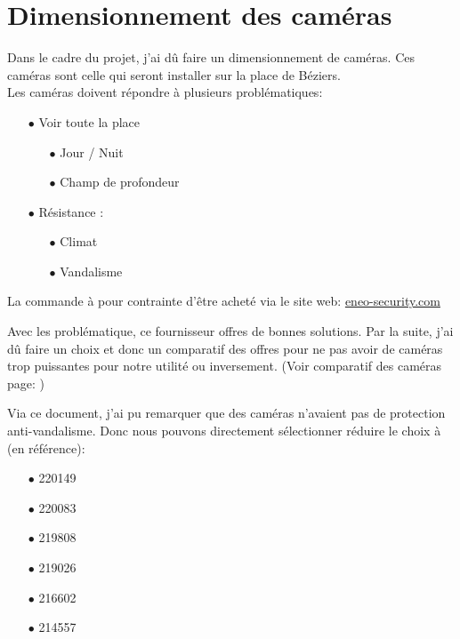 \documentclass[12pt, french]{report}
\begin{document}





\newpage
\section{Dimensionnement des caméras}

Dans le cadre du projet, j'ai dû faire un dimensionnement de caméras. Ces caméras sont celle qui seront installer sur la place de Béziers.\\

Les caméras doivent répondre à plusieurs problématiques:
\begin{itemize}
    \item[$\bullet$] Voir toute la place
    \begin{itemize}
        \item[$\bullet$] Jour / Nuit
        \item[$\bullet$] Champ de profondeur
    \end{itemize}
    \item[$\bullet$] Résistance :
    \begin{itemize}
        \item[$\bullet$] Climat
        \item[$\bullet$]Vandalisme
    \end{itemize}
\end{itemize}

La commande à pour contrainte d'être acheté via le site web: \href{eneo-security.com}{eneo-security.com}\newline

Avec les problématique, ce fournisseur offres de bonnes solutions. Par la suite, j'ai dû faire un choix et donc un comparatif des offres pour ne pas avoir de caméras trop puissantes pour notre utilité ou inversement.  (Voir comparatif des caméras page: \pageref{Comparatif.pdf})

Via ce document, j'ai pu remarquer que des caméras n'avaient pas de protection anti-vandalisme. Donc nous pouvons directement sélectionner réduire le choix à (en référence): \begin{itemize}
    \item[$\bullet$] 220149
    \item[$\bullet$] 220083
    \item[$\bullet$] 219808
    \item[$\bullet$] 219026
    \item[$\bullet$] 216602
    \item[$\bullet$] 214557\\
\end{itemize}
\end{document}

